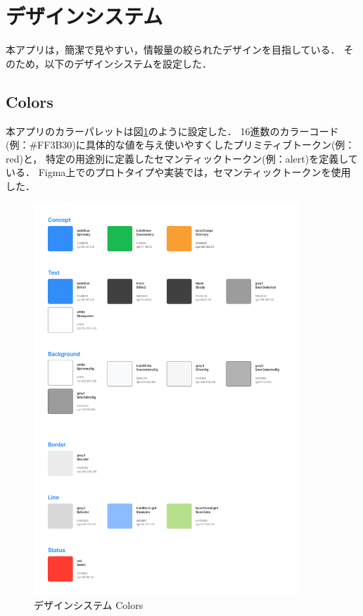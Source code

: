 \section{デザインシステム}
    本アプリは，簡潔で見やすい，情報量の絞られたデザインを目指している．
    そのため，以下のデザインシステムを設定した．
\subsection{Colors}
    本アプリのカラーパレットは図\ref{fig:feature_colors}のように設定した．
    16進数のカラーコード(例：\#FF3B30)に具体的な値を与え使いやすくしたプリミティブトークン(例：red)と，
    特定の用途別に定義したセマンティックトークン(例：alert)を定義している．
    Figma上でのプロトタイプや実装では，セマンティックトークンを使用した．
    \pagebreak
    \begin{figure}
        \centering
        \includegraphics[width=10cm]{images/colors.png}
        \caption{デザインシステム Colors}
        \label{fig:feature_colors}
    \end{figure}
